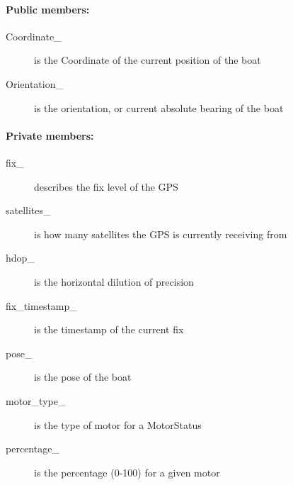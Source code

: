 \paragraph{Public members:}
\begin{adjustwidth}{2.5em}{0pt}\begin{description}
		\item [Coordinate_] is the Coordinate of the current position of the boat 
		\item [Orientation_] is the orientation, or current absolute bearing of the boat
\end{description}\end{adjustwidth}

\paragraph{Private members:}
\begin{adjustwidth}{2.5em}{0pt}\begin{description}
		\item [fix_] describes the fix level of the GPS
		\item [satellites_] is how many satellites the GPS is currently receiving from
		\item [hdop_] is the horizontal dilution of precision
		\item [fix_timestamp_] is the timestamp of the current fix 
		\item [pose_] is the pose of the boat
		\item [motor_type_] is the type of motor for a MotorStatus
		\item [percentage_] is the percentage (0-100) for a given motor
\end{description}\end{adjustwidth}